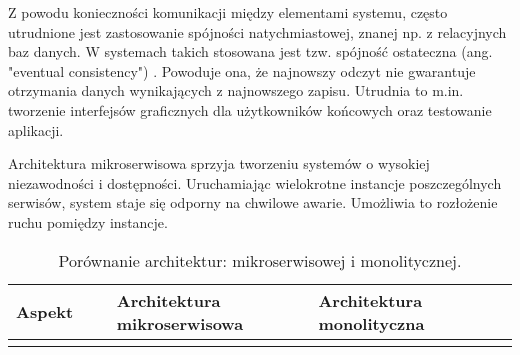 Z powodu konieczności komunikacji między elementami systemu, często utrudnione jest zastosowanie spójności natychmiastowej, znanej np. z relacyjnych baz danych. W systemach takich stosowana jest tzw. spójność ostateczna (ang. "eventual consistency") \cite{eventual_consistency}. Powoduje ona, że najnowszy odczyt nie gwarantuje otrzymania danych wynikających z najnowszego zapisu. Utrudnia to m.in. tworzenie interfejsów graficznych dla użytkowników końcowych oraz testowanie aplikacji.

Architektura mikroserwisowa sprzyja tworzeniu systemów o wysokiej niezawodności i dostępności. Uruchamiając wielokrotne instancje poszczególnych serwisów, system staje się odporny na chwilowe awarie. Umożliwia to rozłożenie ruchu pomiędzy instancje.

\begin{longtable}{| m{0.2\linewidth} | m{0.4\linewidth} | m{0.4\linewidth} |}
    \caption{Porównanie architektur: mikroserwisowej i monolitycznej.}
    \label{table:architektura_porownanie} \\

    \hline
    Aspekt & Architektura mikroserwisowa & Architektura monolityczna \\ \hline\hline \endfirsthead \endfoot
    \hline \endlastfoot


\end{longtable}

